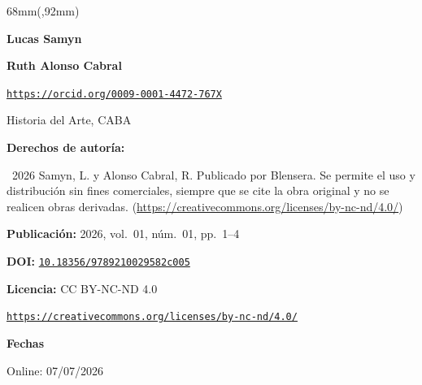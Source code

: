 \begin{textblock*}{68mm}(\gbbloquex,92mm)
{\setlength{\leftskip}{0pt}\setlength{\parindent}{0pt}%
\noindent\begin{minipage}[t]{68mm}
\sffamily\small\setlength{\parskip}{1pt}
{\bfseries\color{azulrevista}Lucas Samyn}\par
\vspace{4pt}
{\bfseries\color{azulrevista}Ruth Alonso Cabral}\par
{\scriptsize\texttt{\href{https://orcid.org/0009-0001-4472-767X}{https://orcid.org/0009-0001-4472-767X}}}\par
Historia del Arte, CABA\par
\vspace{6pt}
{\bfseries\color{azulrevista!70}Derechos de autor\'ia:}\par
\textcopyright\ 2026 Samyn, L. y Alonso Cabral, R. Publicado por Blensera. Se permite el uso y distribución sin fines comerciales, siempre que se cite la obra original y no se realicen obras derivadas. (\href{https://creativecommons.org/licenses/by-nc-nd/4.0/}{https://creativecommons.org/licenses/by-nc-nd/4.0/})\par\vspace{6pt}
{\bfseries\color{azulrevista!70}Publicación:} 2026, vol.~01, n\'um.~01, pp.~1--4\par\vspace{6pt}
{\bfseries\color{azulrevista!70}DOI:} {\scriptsize\texttt{\href{https://doi.org/10.18356/9789210029582c005}{10.18356/9789210029582c005}}}\par\vspace{6pt}
{\bfseries\color{azulrevista!70}Licencia:} CC BY-NC-ND 4.0\par
{\scriptsize\texttt{\href{https://creativecommons.org/licenses/by-nc-nd/4.0/}{https://creativecommons.org/licenses/by-nc-nd/4.0/}}}\par
\vspace{6pt}
{\bfseries\color{azulrevista!70}Fechas}\par\vspace{2pt}
Online: 07/07/2026\par
\vspace{6pt}
\end{minipage}%
}%
\end{textblock*}


